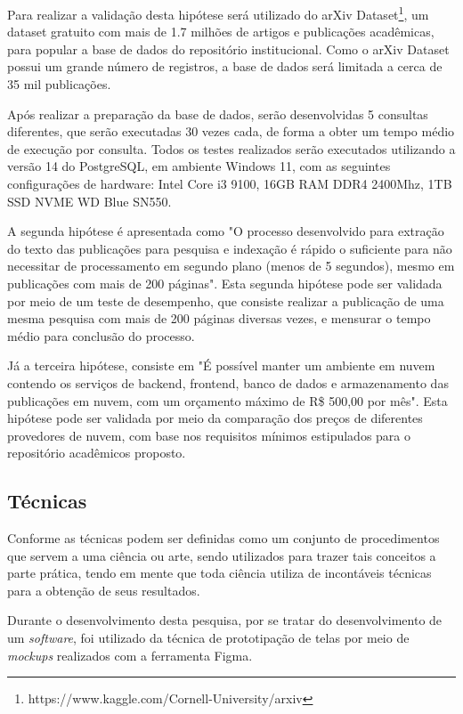 Para realizar a validação desta hipótese será utilizado do
arXiv Dataset\footnote{https://www.kaggle.com/Cornell-University/arxiv},
um dataset gratuito com mais de 1.7 milhões de artigos e publicações acadêmicas,
para popular a base de dados do repositório institucional. Como o arXiv Dataset
possui um grande número de registros, a base de dados será limitada
a cerca de 35 mil publicações.

Após realizar a preparação da base de dados, serão desenvolvidas
5 consultas diferentes, que serão executadas 30 vezes cada, de forma a obter um tempo
médio de execução por consulta. Todos os testes realizados serão executados utilizando
a versão 14 do PostgreSQL, em ambiente Windows 11, com as seguintes configurações de hardware:
Intel Core i3 9100, 16GB RAM DDR4 2400Mhz, 1TB SSD NVME WD Blue SN550.

A segunda hipótese é apresentada como "O processo desenvolvido
para extração do texto das publicações para pesquisa e indexação
é rápido o suficiente para não necessitar de processamento em
segundo plano (menos de 5 segundos), mesmo em publicações com mais
de 200 páginas". Esta segunda hipótese pode ser validada por meio
de um teste de desempenho, que consiste realizar a publicação de uma
mesma pesquisa com mais de 200 páginas diversas vezes, e mensurar
o tempo médio para conclusão do processo.

Já a terceira hipótese, consiste em "É possível manter um ambiente
em nuvem contendo os serviços de backend, frontend, banco de dados
e armazenamento das publicações em nuvem, com um orçamento máximo
de R\$ 500,00 por mês". Esta hipótese pode ser validada por meio
da comparação dos preços de diferentes provedores de nuvem, com
base nos requisitos mínimos estipulados para o repositório
acadêmicos proposto.

\subsection{Técnicas}

Conforme \citep[p. 174]{LAKATOS2003:metodologia} as técnicas podem
ser definidas como um conjunto de procedimentos que servem a
uma ciência ou arte, sendo utilizados para trazer tais
conceitos a parte prática, tendo em mente que toda ciência utiliza
de incontáveis técnicas para a obtenção de seus resultados.

Durante o desenvolvimento desta pesquisa, por se tratar do
desenvolvimento de um \emph{software}, foi utilizado da técnica
de prototipação de telas por meio de \emph{mockups} realizados
com a ferramenta Figma.

